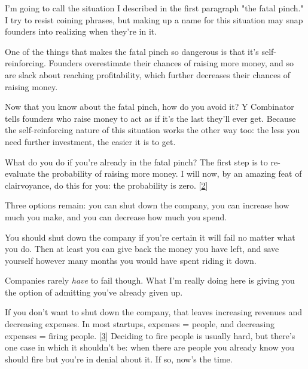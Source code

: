                   I'm going to call the situation I described in the first
                  paragraph "the fatal pinch." I try to resist coining phrases,
                  but making up a name for this situation may snap founders into
                  realizing when they're in it.

One of the things
                  that makes the fatal pinch so dangerous is that it's
                  self-reinforcing. Founders overestimate their chances of
                  raising more money, and so are slack about reaching
                  profitability, which further decreases their chances of
                  raising money.

Now that you know about the fatal
                  pinch, how do you avoid it? Y Combinator tells founders
                  who raise money to act as if it's the last they'll ever get.
                  Because the self-reinforcing nature of this situation works
                  the other way too: the less you need further investment, the
                  easier it is to get.

What do you do if you're
                  already in the fatal pinch? The first step is to re-evaluate
                  the probability of raising more money. I will now, by an
                  amazing feat of clairvoyance, do this for you: the probability
                  is zero.
                  [\href{\#f2n}{2}]

Three options remain: you can shut down the
                  company, you can increase how much you make, and you can
                  decrease how much you spend.

You should shut down
                  the company if you're certain it will fail no matter what you
                  do. Then at least you can give back the money you have left,
                  and save yourself however many months you would have spent
                  riding it down.

Companies rarely \emph{have} to
                  fail though. What I'm really doing here is giving you the
                  option of admitting you've already given up.

If you
                  don't want to shut down the company, that leaves increasing
                  revenues and decreasing expenses. In most startups, expenses =
                  people, and decreasing expenses = firing people.
                  [\href{\#f3n}{3}]
                  Deciding to fire people is usually hard, but there's one case
                  in which it shouldn't be: when there are people you already
                  know you should fire but you're in denial about it. If so,
                  now's the time.

